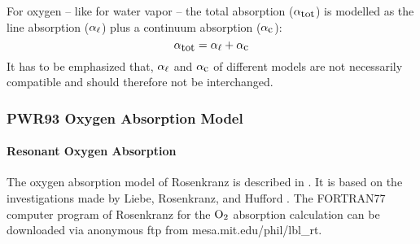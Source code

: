 For oxygen -- like for water vapor -- the total absorption 
($\alpha_{\mbox{\rm \small tot}}$) is modelled as the line absorption ($\alpha_{\ell}$) plus a  
continuum absorption ($\alpha_{\mbox{\small c}}$):
\begin{equation}
  \label{eq:o2:totabs}
  \alpha_{\mbox{\rm \small tot}} = \alpha_{\ell} + \alpha_{\mbox{\small c}}
\end{equation}
It has to be emphasized that, $\alpha_{\ell}$ and $\alpha_{\mbox{\small c}}$ of different
models are not necessarily compatible and should therefore not be interchanged.




\subsubsection{PWR93 Oxygen Absorption Model}
\label{leveld:O2_pwr98}


\paragraph{Resonant Oxygen Absorption}
\label{levele:pwr93_o2lines}
The oxygen absorption model of Rosenkranz is described in \citet{pwr:93}. It 
is based on the investigations made by Liebe, Rosenkranz, and Hufford 
\citep{liebeetal:92}. The FORTRAN77 computer program of Rosenkranz for 
the $\mbox{O}_2$ absorption calculation can be downloaded via anonymous ftp from 
mesa.mit.edu/phil/lbl\_rt.

